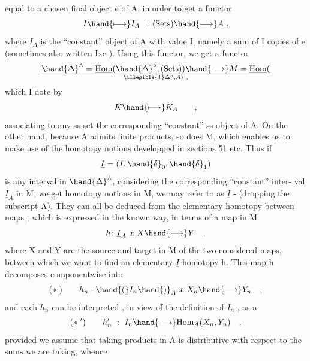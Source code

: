 equal to a chosen final object e of A,  in order to get a functor
\[ I \hand{\longmapsto} I_A \ : \ \text{(Sets)} \hand{\longrightarrow} A \ , \]
where $I_A$  is the ``constant'' object of A with value I,  namely a sum of I
copies of e (sometimes also written  Ixe ).  Using this functor,  we get
a functor
\[ \hand{\Delta}^{\wedge} = \underline{\mathrm{Hom}}(\hand{\Delta}^{\circ}, \text{(Sets)}) \hand{\longrightarrow} M = \underline{\mathrm{Hom}}(\over{\illegible{1}}{\Delta}^{\circ} , A) \ , \]
which I dote by
\[ K \hand{\longmapsto} K_A \qquad , \]
associating to any ss set the corresponding ``constant''  ss object of A.
On the other hand,  because A admits finite products,  so does M,  which
enables us to make use of the homotopy notions developped in sections 51
etc.  Thus if
\[ \underline{I} = (I, \hand{\delta}_0, \hand{\delta}_1) \]
is any interval in $\hand{\Delta}^{\wedge}$,  considering the corresponding ``constant''  inter-%
val  $\underline{I}_A$  in M,  we get homotopy notions in M,   we may refer to as
$\underline{I}$ - \hand{\uline{\textcolor{black}{homotopy}}} (dropping the subscript A).  They can all be deduced from the
elementary  homotopy  between maps ,  which  is expressed in the
known way,  in terms of a map in  M
\[ h\colon \underline{I}_A \ x \ X \hand{\longrightarrow} Y \quad , \]
where X and Y are the source and target in M of the two considered maps,
between which we want to find an  elementary $\underline{I}$-homotopy h.  This
map h  decomposes componentwise into
\[ (*\ ) \qquad h_n : \hand{(}I_n\hand{)}_A \ x \ X_n \hand{\longrightarrow} Y_n \quad , \]
and each $h_n$ can be interpreted , in view of the definition of $I_n$ ,  as a
 
\[ (*\ ') \qquad h'_n \ : \ I_n \hand{\longrightarrow} \mathrm{Hom}_A(X_n,Y_n) \quad , \]
provided we assume that taking products in A is distributive with respect
to the sums we are taking,  whence
